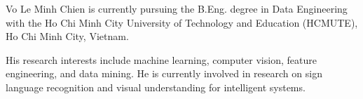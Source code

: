 \documentclass{ieeeaccess}
\begin{document}
\begin{IEEEbiographynophoto}{Vo Le Minh Chien}
is currently pursuing the B.Eng. degree in Data Engineering with the Ho Chi Minh
City University of Technology and Education (HCMUTE), Ho Chi Minh City,
Vietnam.

His research interests include machine learning, computer vision, feature
engineering, and data mining. He is currently involved in research on sign
language recognition and visual understanding for intelligent systems.
\end{IEEEbiographynophoto}
\end{document}
